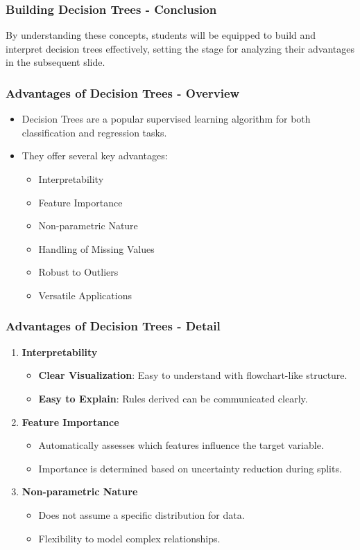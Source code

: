 \documentclass[aspectratio=169]{beamer}
\begin{document}
\begin{frame}[fragile]
    \frametitle{Building Decision Trees - Conclusion}
    By understanding these concepts, students will be equipped to build and interpret decision trees effectively, 
    setting the stage for analyzing their advantages in the subsequent slide.
\end{frame}

\begin{frame}[fragile]
    \frametitle{Advantages of Decision Trees - Overview}
    \begin{itemize}
        \item Decision Trees are a popular supervised learning algorithm for both classification and regression tasks.
        \item They offer several key advantages:
        \begin{itemize}
            \item Interpretability
            \item Feature Importance
            \item Non-parametric Nature
            \item Handling of Missing Values
            \item Robust to Outliers
            \item Versatile Applications
        \end{itemize}
    \end{itemize}
\end{frame}

\begin{frame}[fragile]
    \frametitle{Advantages of Decision Trees - Detail}
    \begin{enumerate}
        \item \textbf{Interpretability}
        \begin{itemize}
            \item \textbf{Clear Visualization}: Easy to understand with flowchart-like structure.
            \item \textbf{Easy to Explain}: Rules derived can be communicated clearly.
        \end{itemize}
        
        \item \textbf{Feature Importance}
        \begin{itemize}
            \item Automatically assesses which features influence the target variable.
            \item Importance is determined based on uncertainty reduction during splits.
        \end{itemize}
        
        \item \textbf{Non-parametric Nature}
        \begin{itemize}
            \item Does not assume a specific distribution for data.
            \item Flexibility to model complex relationships.
        \end{itemize}
    \end{enumerate}
\end{frame}
\end{document}
